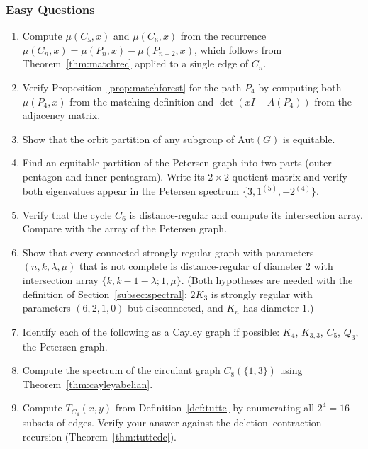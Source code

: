 \subsubsection{Easy Questions}
\begin{enumerate}
\item Compute $\mu(C_5, x)$ and $\mu(C_6, x)$ from the recurrence
$\mu(C_n, x) = \mu(P_n, x) - \mu(P_{n-2}, x)$, which follows from
Theorem~\ref{thm:matchrec} applied to a single edge of $C_n$.

\item Verify Proposition~\ref{prop:matchforest} for the path $P_4$ by
computing both $\mu(P_4, x)$ from the matching definition and
$\det(xI - A(P_4))$ from the adjacency matrix.

\item Show that the orbit partition of any subgroup of $\mathrm{Aut}(G)$ is
equitable.

\item Find an equitable partition of the Petersen graph into two parts
(outer pentagon and inner pentagram). Write its $2 \times 2$ quotient
matrix and verify both eigenvalues appear in the Petersen spectrum
$\{3, 1^{(5)}, -2^{(4)}\}$.

\item Verify that the cycle $C_6$ is distance-regular and compute its
intersection array. Compare with the array of the Petersen graph.

\item Show that every connected strongly regular graph with parameters
$(n, k, \lambda, \mu)$ that is not complete is distance-regular of
diameter $2$ with intersection array $\{k, k - 1 - \lambda; 1, \mu\}$.
(Both hypotheses are needed with the definition of Section~\ref{subsec:spectral}: $2K_3$ is
strongly regular with parameters $(6, 2, 1, 0)$ but disconnected, and
$K_n$ has diameter $1$.)

\item Identify each of the following as a Cayley graph if possible: $K_4$,
$K_{3,3}$, $C_5$, $Q_3$, the Petersen graph.

\item Compute the spectrum of the circulant graph $C_8(\{1, 3\})$ using
Theorem~\ref{thm:cayleyabelian}.

\item Compute $T_{C_4}(x, y)$ from Definition~\ref{def:tutte} by enumerating
all $2^4 = 16$ subsets of edges. Verify your answer against the
deletion--contraction recursion (Theorem~\ref{thm:tuttedc}).


\end{enumerate}

